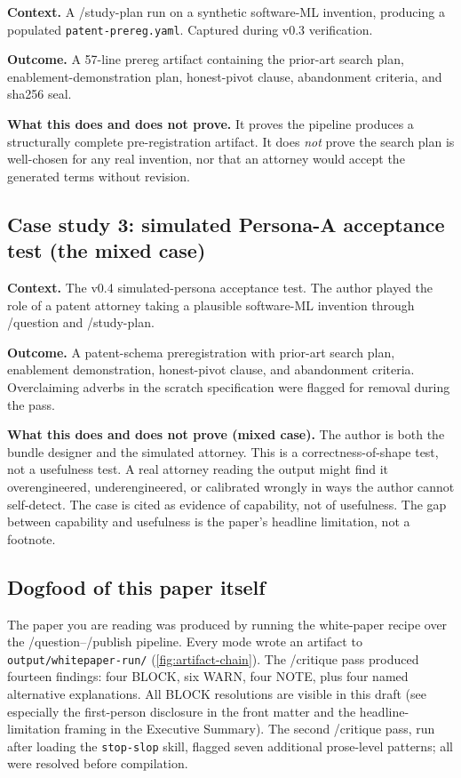 \documentclass[11pt,letterpaper]{article}
\begin{document}
\textbf{Context.} A /study-plan run on a synthetic software-ML
invention, producing a populated \texttt{patent-prereg.yaml}.
Captured during v0.3 verification.

\textbf{Outcome.} A 57-line prereg artifact containing the prior-art
search plan, enablement-demonstration plan, honest-pivot clause,
abandonment criteria, and sha256 seal.

\textbf{What this does and does not prove.} It proves the pipeline
produces a structurally complete pre-registration artifact. It does
\emph{not} prove the search plan is well-chosen for any real
invention, nor that an attorney would accept the generated terms
without revision.

\subsection{Case study 3: simulated Persona-A acceptance test
(the mixed case)}

\textbf{Context.} The v0.4 simulated-persona acceptance test. The
author played the role of a patent attorney taking a plausible
software-ML invention through /question and /study-plan.

\textbf{Outcome.} A patent-schema preregistration with prior-art
search plan, enablement demonstration, honest-pivot clause, and
abandonment criteria. Overclaiming adverbs in the scratch
specification were flagged for removal during the pass.

\textbf{What this does and does not prove (mixed case).} The author
is both the bundle designer and the simulated attorney. This is a
correctness-of-shape test, not a usefulness test. A real attorney
reading the output might find it overengineered, underengineered, or
calibrated wrongly in ways the author cannot self-detect. The case
is cited as evidence of capability, not of usefulness. The gap
between capability and usefulness is the paper's headline
limitation, not a footnote.

\subsection{Dogfood of this paper itself}

The paper you are reading was produced by running the white-paper
recipe over the /question--/publish pipeline. Every mode wrote an
artifact to \texttt{output/whitepaper-run/}
(\cref{fig:artifact-chain}). The /critique pass produced fourteen
findings: four BLOCK, six WARN, four NOTE, plus four named
alternative explanations. All BLOCK resolutions are visible in this
draft (see especially the first-person disclosure in the front
matter and the headline-limitation framing in the Executive
Summary). The second /critique pass, run after loading the
\texttt{stop-slop} skill, flagged seven additional prose-level
patterns; all were resolved before compilation.
\end{document}
